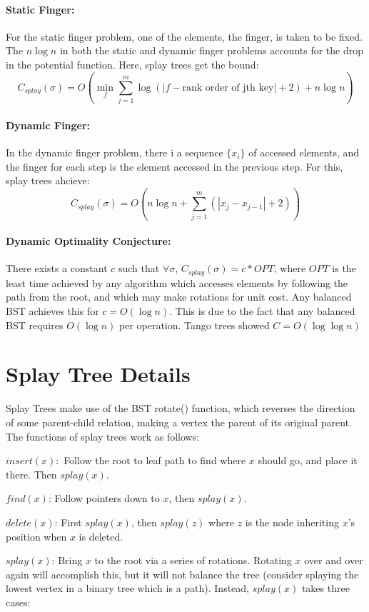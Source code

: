 \documentclass[11pt]{article}
\begin{document}
\paragraph{Static Finger:}
For the static finger problem, one of the elements, the finger, is taken to be fixed. The $n\log n$ in both the static and dynamic finger problems  accounts for the drop in the potential function. Here, splay trees get the bound:
\[C_{splay}(\sigma)=O(\min_f\sum_{j=1}^m\log(|f-\text{rank order of jth key}|+2)+n\log n)\]
\paragraph{Dynamic Finger:}
In the dynamic finger problem, there i a sequence $\{x_i\}$ of accessed elements, and the finger for each step is the element accessed in the previous step. For this, splay trees ahcieve:
\[C_{splay}(\sigma)=O(n\log n+\sum_{j=1}^m(|x_j-x_{j-1}|+2))\]
\paragraph{Dynamic Optimality Conjecture:} There exists a constant $c$ such that $\forall\sigma$, $C_{splay}(\sigma)=c*OPT$, where $OPT$ is the least time achieved by any algorithm which accesses elements by following the path from the root, and which may make rotations for unit cost. Any balanced BST achieves this for $c = O(\log n).$ This is due to the fact that any balanced BST requires $O(\log n)$ per operation. Tango trees showed $C=O(\log \log n)$ \cite{Demai04}

\section{Splay Tree Details}

Splay Trees make use of the BST rotate() function, which reverses the direction of some parent-child relation, making a vertex the parent of its original parent. The functions of splay trees work as follows:

$insert(x):$ Follow the root to leaf path to find where $x$ should go, and place it there. Then $splay(x)$.

$find(x)$: Follow pointers down to $x$, then $splay(x)$.

$delete(x)$: First $splay(x)$, then $splay(z)$ where $z$ is the node inheriting $x$'s position when $x$ is deleted.

$splay(x)$: Bring $x$ to the root via a series of rotations. Rotating $x$ over and over again will accomplish this, but it will not balance the tree (consider splaying the lowest vertex in a binary tree which is a path). Instead, $splay(x)$ takes  three cases:
\end{document}
